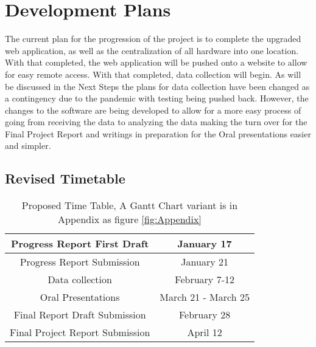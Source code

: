 \section{Development Plans}
The current plan for the progression of the project is to complete the upgraded web application, as well as the centralization of all hardware into one location. With that completed, the web application will be pushed onto a website to allow for easy remote access. With that completed, data collection will begin. As will be discussed in the Next Steps the plans for data collection have been changed as a contingency due to the pandemic with testing being pushed back. However, the changes to the software are being developed to allow for a more easy process of going from receiving the data to analyzing the data making the turn over for the Final Project Report and writings in preparation for the Oral presentations easier and simpler.

\newpage
\subsection{Revised Timetable}

\begin{table}[ht]
\begin{center}
\begin{tabular}{|c|c|}
\hline
Progress Report First Draft &	January 17 \\ 
	\hline
Progress Report Submission &    January 21 \\ 
\hline
 Data collection &	February 7-12 \\ 
\hline
Oral Presentations &	March 21 - March 25 \\ 
\hline
Final Report Draft Submission &	February 28 \\ 
\hline
Final Project Report Submission &   April 12 \\ 
\hline
\hline
\end{tabular}
\caption{Proposed Time Table, A Gantt Chart variant is in Appendix as figure \ref{fig:Appendix}}
\label{table:1}
\end{center}
\end{table}

